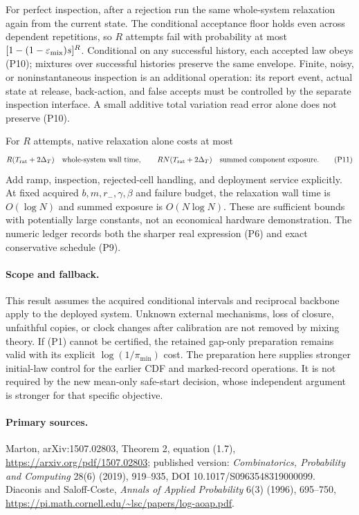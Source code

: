 For perfect inspection, after a rejection run the same whole-system
relaxation again from the current state. The conditional acceptance floor
holds even across dependent repetitions, so \(R\) attempts fail with probability
at most \([1-(1-\varepsilon_{\rm mix})s]^R\).
Conditional on any successful history, each accepted law obeys (P10);
mixtures over successful histories preserve the same envelope.
Finite, noisy, or noninstantaneous inspection is an additional operation:
its report event, actual state at release, back-action, and false accepts must
be controlled by the separate inspection interface. A small additive total
variation read error alone does not preserve (P10).

For \(R\) attempts, native relaxation alone costs at most
\[
 R(T_{\rm rat}+2\Delta_T)\quad\hbox{whole-system wall time},\qquad
 RN(T_{\rm rat}+2\Delta_T)\quad\hbox{summed component exposure}.    \tag{P11}
\]
Add ramp, inspection, rejected-cell handling, and deployment service explicitly.
At fixed acquired \(b,m,r_-,\gamma,\beta\) and failure budget,
the relaxation wall time is \(O(\log N)\) and summed exposure is
\(O(N\log N)\). These are sufficient bounds with potentially large constants,
not an economical hardware demonstration. The numeric ledger records both
the sharper real expression (P6) and exact conservative schedule (P9).

\paragraph{Scope and fallback.}
This result assumes the acquired conditional intervals and reciprocal
backbone apply to the deployed system. Unknown external mechanisms, loss
of closure, unfaithful copies, or clock changes after calibration are not
removed by mixing theory. If (P1) cannot be certified, the retained gap-only
preparation remains valid with its explicit \(\log(1/\pi_{\min})\) cost.
The preparation here supplies stronger initial-law control for the earlier
CDF and marked-record operations. It is not required by the new mean-only
safe-start decision, whose independent argument is stronger for that
specific objective.

\paragraph{Primary sources.}
Marton, arXiv:1507.02803, Theorem 2, equation (1.7),
\url{https://arxiv.org/pdf/1507.02803};
published version: \emph{Combinatorics, Probability and Computing} 28(6)
(2019), 919--935, DOI 10.1017/S0963548319000099.
Diaconis and Saloff-Coste, \emph{Annals of Applied Probability} 6(3)
(1996), 695--750,
\url{https://pi.math.cornell.edu/~lsc/papers/log-aoap.pdf}.

